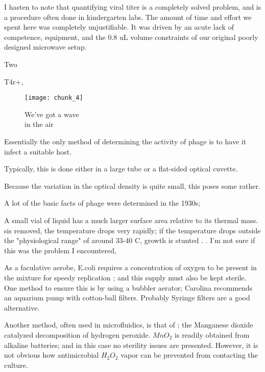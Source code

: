 \documentclass[paper.tex]{subfiles}
\begin{document}
\begin{autem}
	I hasten to note that quantifying viral titer is a completely solved problem, and is a procedure often done in kindergarten labs. The amount of time and effort we spent here was completely unjustifiable. It was driven by an acute lack of competence, equipment, and the 0.8 uL volume constraints of our original poorly designed microwave setup.
\end{autem}

Two 

T4r+,



\begin{figure}[H]
	\captionsetup{singlelinecheck = false, justification=justified}
	\centering
	\texttt{[image: chunk\_4]}
	\caption{
		We've got a wave\\
		in the air}
\end{figure}

Essentially the only method of determining the activity of phage is to have it infect a suitable host.

Typically, this is done either in a large tube or a flat-sided optical cuvette.

Because the variation in the optical density is quite small, this poses some rather. 

A lot of the basic facts of phage were determined in the 1930s; 

A small vial of liquid has a much larger surface area relative to its thermal mass. sis removed, the temperature drops very rapidly; if the temperature drops outside the "physiological range" of around 33-40 C, growth is stunted \cite{effect2003}. \cite{growth1946}. I'm not sure if this was the problem I encountered, 

As a faculative aerobe, E.coli requires a concentration of oxygen to be present in the mixture for speedy replication \cite{Effect1965}; and this supply must also be kept sterile. One method to ensure this is by using a bubbler aerator; Carolina recommends an aquarium pump with cotton-ball filters. Probably Syringe filters are a good alternative.

Another method, often used in microfluidics\cite{Microfluidic}, is that of \cite{method1951}; the Manganese dioxide catalyzed decomposition of hydrogen peroxide. $MnO_2$ is readily obtained from alkaline batteries; and in this case no sterility issues are presented. However, it is not obvious how antimicrobial $H_2O_2$ vapor can be prevented from contacting the culture.
\end{document}
